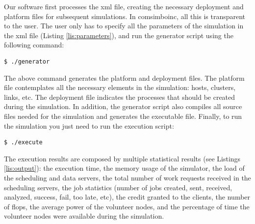 \begin{appendices}
Our software first processes the \gls{xml} file, creating the necessary deployment and platform files for subsequent simulations. In  \gls{comsimboinc}, all this is transparent to the user. The user only has to specify all the parameters of the simulation in the \gls{xml} file (Listing \ref{lis:parameters}), and run the generator script using the following command:

\vspace{0.6cm}

\begin{lstlisting}[language=bash]
  $ ./generator
\end{lstlisting}

\vspace{0.6cm}

The above command generates the platform and deployment files. The platform file contemplates all the necessary elements in the simulation: hosts, clusters, links, etc. The deployment file indicates the processes that should be created during the simulation. In addition, the generator script also compiles all source files needed for the simulation and generates the executable file. Finally, to run the simulation you just need to run the execution script:

\vspace{0.6cm}

\begin{lstlisting}[language=bash]
  $ ./execute
\end{lstlisting}

\vspace{0.6cm}

The execution results are composed by multiple statistical results (see Listings \ref{lis:output}): the execution time, the memory usage of the simulator, the load of the \gls{scheduling} and data servers, the total number of work requests received in the \gls{scheduling} servers, the job statistics (number of jobs created, sent, received, analyzed, success, fail, too late, etc), the credit granted to the clients, the number of \acrshort{flops}, the average power of the volunteer nodes, and the percentage of time the volunteer nodes were available during the simulation.

\clearpage

    

\end{appendices}
